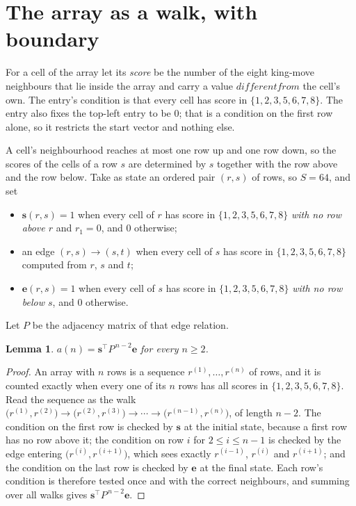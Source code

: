 \documentclass[11pt,a4paper]{article}
\theoremstyle{plain}
\newtheorem{lemma}[theorem]{Lemma}
\theoremstyle{definition}
\begin{document}
\section{The array as a walk, with boundary}

For a cell of the array let its \emph{score} be the number of the eight king-move neighbours that lie inside
the array and carry a value $different from$ the cell's own. The entry's condition is that every cell
has score in $\{1,2,3,5,6,7,8\}$. The entry also fixes the top-left entry to be $0$; that is a condition on the first row alone, so it restricts the start vector and nothing else.

A cell's neighbourhood reaches at most one row up and one row down, so the scores of the
cells of a row $s$ are determined by $s$ together with the row above and the row below.
Take as state an ordered pair $(r,s)$ of rows, so $S=64$, and set
\begin{itemize}
\item $\mathbf{s}(r,s)=1$ when every cell of $r$ has score in $\{1,2,3,5,6,7,8\}$ \emph{with no row
above $r$} and $r_1=0$, and $0$ otherwise;
\item an edge $(r,s)\to(s,t)$ when every cell of $s$ has score in $\{1,2,3,5,6,7,8\}$ computed from
$r$, $s$ and $t$;
\item $\mathbf{e}(r,s)=1$ when every cell of $s$ has score in $\{1,2,3,5,6,7,8\}$ \emph{with no row
below $s$}, and $0$ otherwise.
\end{itemize}
Let $P$ be the adjacency matrix of that edge relation.

\begin{lemma}\label{lem:walk}
$a(n)=\mathbf{s}^{\!\top}P^{\,n-2}\mathbf{e}$ for every $n\ge2$.
\end{lemma}

\begin{proof}
An array with $n$ rows is a sequence $r^{(1)},\dots,r^{(n)}$ of rows, and it is counted
exactly when every one of its $n$ rows has all scores in $\{1,2,3,5,6,7,8\}$. Read the sequence as the
walk $\bigl(r^{(1)},r^{(2)}\bigr)\to\bigl(r^{(2)},r^{(3)}\bigr)\to\cdots\to
\bigl(r^{(n-1)},r^{(n)}\bigr)$, of length $n-2$. The condition on the first row is
checked by $\mathbf{s}$ at the initial state, because a first row has no row above it; the
condition on row $i$ for $2\le i\le n-1$ is checked by the edge entering
$\bigl(r^{(i)},r^{(i+1)}\bigr)$, which sees exactly $r^{(i-1)}$, $r^{(i)}$ and
$r^{(i+1)}$; and the condition on the last row is checked by $\mathbf{e}$ at the final
state. Each row's condition is therefore tested once and with the correct neighbours, and
summing over all walks gives $\mathbf{s}^{\!\top}P^{\,n-2}\mathbf{e}$.
\end{proof}
\end{document}
